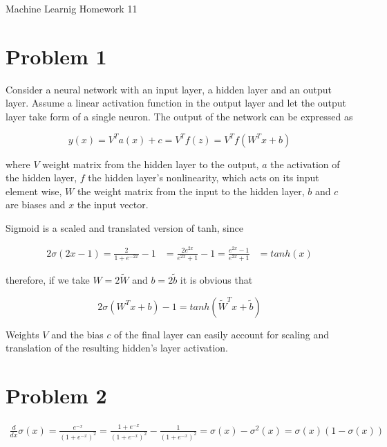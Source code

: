 \documentclass[12pt]{article}
\begin{document}
\begin{center}
{\Large Machine Learnig Homework 11} \\[.3in]
\end{center}
\vspace*{.5in}


\section*{Problem 1}

Consider a neural network with an input layer, a hidden layer and an output layer. Assume a linear activation function in the output layer and let the output layer take form of a single neuron. The output of the network can be expressed as 

\begin{equation}
 y(x) = V^T a(x) + c = V^T f(z) = V^T f(W^T x + b)
\end{equation}

where $V$ weight matrix from the hidden layer to the output, $a$ the activation of the hidden layer, $f$ the hidden layer's nonlinearity, which acts on its input element wise, $W$ the weight matrix from the input to the hidden layer, $b$ and $c$ are biases and $x$ the input vector.

Sigmoid is a scaled and translated version of tanh, since

\begin{equation}
\begin{align}
 2 \sigma(2x - 1) = \frac{2}{1+e^{-2x}} - 1 &= \frac{2e^{2x}}{e^{2x}+1} - 1 = \frac{e^{2x}-1}{e^{2x}+1} &= tanh(x)
 \end{align}
\end{equation}

therefore, if we take $W = 2 \widetilde{W}$ and $b = 2 \widetilde{b}$ it is obvious that

\begin{equation}
 2 \sigma(W^T x + b) - 1 = tanh(\widetilde{W}^T x + \widetilde{b}) 
\end{equation}

Weights $V$ and the bias $c$ of the final layer can easily account for scaling and translation of the resulting hidden's layer activation.

\section*{Problem 2}

\begin{equation}
 \begin{align}
  \frac{d}{dx} \sigma(x) = \frac{e^{-x}}{(1 + e^{-x})^2} = \frac{1 + e^{-x}}{(1 + e^{-x})^2} - \frac{1}{(1 + e^{-x})^2} = \sigma(x) - \sigma^2(x) = \sigma(x)(1 - \sigma(x))
 \end{align}
\end{equation}
\end{document}
